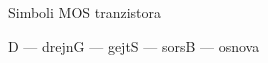 \begin{frame}[label=09_1-s002]{Simboli MOS tranzistora}\setlength{\parskip}{2pt}\setlength{\abovedisplayskip}{4pt}\setlength{\belowdisplayskip}{4pt}\setlength{\abovedisplayshortskip}{3pt}\setlength{\belowdisplayshortskip}{3pt}
\centering \par\medskip D — drejn\qquad G — gejt\qquad S — sors\qquad B — osnova
\end{frame}
